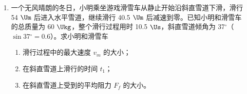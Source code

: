 \documentclass[\gkver]{gaokaozhenti}
\begin{document}
\begin{enumerate}
{（2）①连线如答图甲所示；②作图如答图乙所示；③由题图丁知，P 点对应电压约为 $U=1.40\UV$，电流约为 $I=0.23\UA$，由欧姆定律得 $R=\frac{U}{I}\approx6.1\UO$，故 C 正确。

}

\item
一个无风晴朗的冬日，小明乘坐游戏滑雪车从静止开始沿斜直雪道下滑，滑行 54 $\Um$ 后进入水平雪道，继续滑行 40.5 $\Um$ 后减速到零。已知小明和滑雪车的总质量为 60 $\Ukg$，整个滑行过程用时 10.5 $\Us$，斜直雪道倾角为 37${^\circ}$（$\sin37{^\circ}=0.6$）。求小明和滑雪车
\begin{enumerate}
	\item
	滑行过程中的最大速度 $v_{m}$ 的大小；
	\item
	在斜直雪道上滑行的时间 $t_{1}$；
	\item
	在斜直雪道上受到的平均阻力 $F_{f}$ 的大小。
\end{enumerate}


\end{enumerate}
\end{document}
